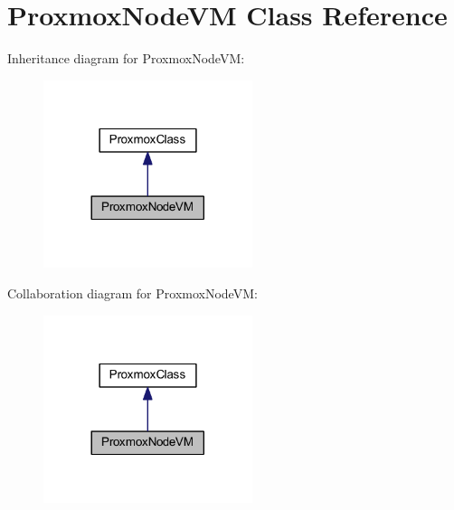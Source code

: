 \hypertarget{class_proxmox_node_v_m}{}\section{Proxmox\+Node\+V\+M Class Reference}
\label{class_proxmox_node_v_m}


Inheritance diagram for Proxmox\+Node\+V\+M\+:
\nopagebreak
\begin{figure}[H]
\begin{center}
\leavevmode
\includegraphics[width=173pt]{class_proxmox_node_v_m__inherit__graph}
\end{center}
\end{figure}


Collaboration diagram for Proxmox\+Node\+V\+M\+:
\nopagebreak
\begin{figure}[H]
\begin{center}
\leavevmode
\includegraphics[width=173pt]{class_proxmox_node_v_m__coll__graph}
\end{center}
\end{figure}
